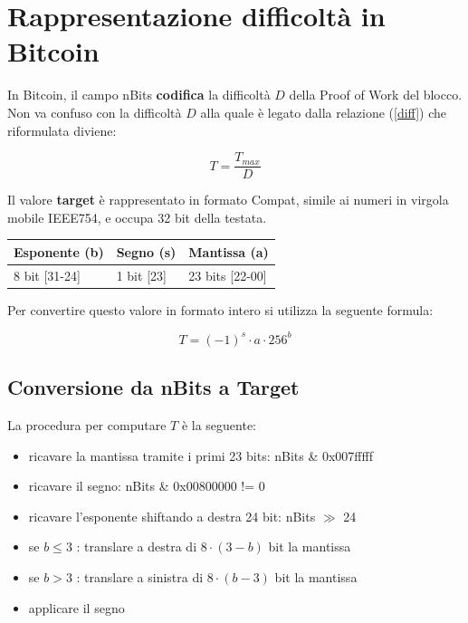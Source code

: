 \documentclass{article}
\begin{document}
\section{Rappresentazione difficoltà in Bitcoin}

In Bitcoin, il campo nBits \textbf{codifica} la difficoltà $D$ della Proof of Work del blocco.
Non va confuso con la difficoltà $D$ alla quale è legato dalla relazione (\ref{diff}) che riformulata diviene:

\begin{equation}
    T = \frac{T_{max}}{D} \label{targetFromDiff}
\end{equation}

Il valore \textbf{target} è rappresentato in formato Compat, simile ai numeri in virgola mobile IEEE754, e occupa 32 bit della testata.

\begin{table}[h]
    \centering
    \begin{tabular}{|l|l|l|}
        \hline
        \multicolumn{1}{|c|}{Esponente (b)} & \multicolumn{1}{c|}{Segno (s)} & \multicolumn{1}{c|}{Mantissa (a)} \\ \hline
        8 bit {[}31-24{]}               & 1 bit {[}23{]}             & 23 bits {[}22-00{]}           \\ \hline
    \end{tabular}
\end{table}

Per convertire questo valore in formato intero si utilizza la seguente formula:

\begin{equation}
    T = (-1)^{s} \cdot a \cdot 256^{b}
\end{equation}

\subsection{Conversione da nBits a Target}

La procedura per computare $T$ è la seguente:

\begin{itemize}
    \item ricavare la mantissa tramite i primi 23 bits: nBits \& 0x007fffff
    \item ricavare il segno: nBits \& 0x00800000 != 0
    \item ricavare l'esponente shiftando a destra 24 bit: nBits $\gg$ 24
    \item se $b \le 3$ : translare a destra di $8 \cdot {(3 - b)}$ bit la mantissa
    \item se $b > 3$ : translare a sinistra di $8 \cdot {(b - 3)}$ bit la mantissa
    \item applicare il segno
\end{itemize}
\end{document}
